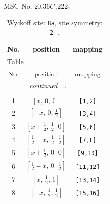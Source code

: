 \documentclass[fleqn,8pt]{jsarticle}
\begin{document}
\setcounter{MaxMatrixCols}{32}

\renewcommand{\tablename}{Table~}
\renewcommand{\figurename}{Figure~}
\begin{center}
\LARGE
MSG No. 20.36\quad$C_{a}222_{1}$
\end{center}
\renewcommand{\arraystretch}{1.2}
\begin{longtable}{ccc}
\caption{Wyckoff site: {\tt 8a}, site symmetry: {\tt 2..}}
 \\
 \hline \hline
No. & position & mapping \\ \hline \endfirsthead

\multicolumn{2}{l}{\tablename\ \thetable{}} \\
 \hline \hline
No. & position & mapping \\ \hline \endhead

 \hline \hline
\multicolumn{2}{r}{\footnotesize\it continued ...} \\ \endfoot

 \hline \hline
\multicolumn{2}{r}{} \\ \endlastfoot

1 & $\left[ x,\, 0,\, 0 \right]$ & {\tt [1,2]} \\ \hline
2 & $\left[ - x,\, 0,\, \frac{1}{2} \right]$ & {\tt [3,4]} \\ \hline
3 & $\left[ x + \frac{1}{2},\, \frac{1}{2},\, 0 \right]$ & {\tt [5,6]} \\ \hline
4 & $\left[ \frac{1}{2} - x,\, \frac{1}{2},\, \frac{1}{2} \right]$ & {\tt [7,8]} \\ \hline
5 & $\left[ x + \frac{1}{2},\, 0,\, 0 \right]$ & {\tt [9,10]} \\ \hline
6 & $\left[ \frac{1}{2} - x,\, 0,\, \frac{1}{2} \right]$ & {\tt [11,12]} \\ \hline
7 & $\left[ x,\, \frac{1}{2},\, 0 \right]$ & {\tt [13,14]} \\ \hline
8 & $\left[ - x,\, \frac{1}{2},\, \frac{1}{2} \right]$ & {\tt [15,16]} \\
\end{longtable}
\renewcommand{\arraystretch}{1.2}
\end{document}
